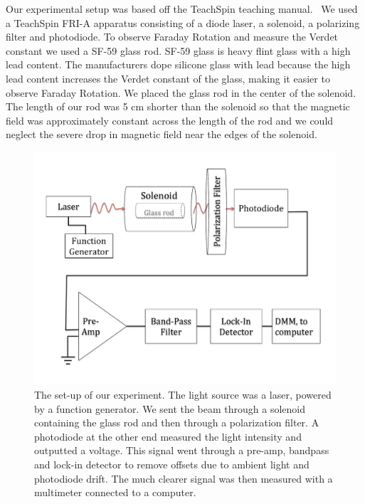 \documentclass[prb,preprint]{revtex4-1}
\begin{document}
Our experimental setup was based off the TeachSpin teaching manual.~\cite{teachspin} We used a TeachSpin FRI-A apparatus consisting of a diode laser, a solenoid, a polarizing filter and photodiode. To observe Faraday Rotation and measure the Verdet constant we used a SF-59 glass rod. SF-59 glass is heavy flint glass with a high lead content. The manufacturers dope silicone glass with lead because the high lead content increases the Verdet constant of the glass, making it easier to observe Faraday Rotation.\cite{opticalglass} We placed the glass rod in the center of the solenoid. The length of our rod was 5 cm shorter than the solenoid so that the magnetic field was approximately constant across the length of the rod and we could neglect the severe drop in magnetic field near the edges of the solenoid.

\begin{figure}[h!]
\centering
\includegraphics[width=6in]{Faraday_lab_set-up.pdf}
\caption{The set-up of our experiment. The light source was a laser, powered by a function generator. We sent the beam through a solenoid containing the glass rod and then through a polarization filter. A photodiode at the other end measured the light intensity and outputted a voltage. This signal went through a pre-amp, bandpass and lock-in detector to remove offsets due to ambient light and photodiode drift. The much clearer signal was then measured with a multimeter connected to a computer.}
\label{set-up}
\end{figure}
\end{document}
